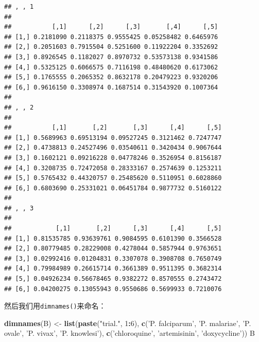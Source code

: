 \documentclass[]{book}
\newenvironment{Shaded}{\begin{snugshade}}{\end{snugshade}}
\newcommand{\DecValTok}[1]{\textcolor[rgb]{0.00,0.00,0.81}{#1}}
\newcommand{\KeywordTok}[1]{\textcolor[rgb]{0.13,0.29,0.53}{\textbf{#1}}}
\newcommand{\NormalTok}[1]{#1}
\newcommand{\OperatorTok}[1]{\textcolor[rgb]{0.81,0.36,0.00}{\textbf{#1}}}
\newcommand{\StringTok}[1]{\textcolor[rgb]{0.31,0.60,0.02}{#1}}
\begin{document}
\begin{verbatim}
## , , 1
## 
##           [,1]      [,2]      [,3]       [,4]      [,5]
## [1,] 0.2181090 0.2118375 0.9555425 0.05258482 0.6465976
## [2,] 0.2051603 0.7915504 0.5251600 0.11922204 0.3352692
## [3,] 0.8926545 0.1182027 0.8970732 0.53573138 0.9341586
## [4,] 0.5325125 0.6066575 0.7116198 0.48480620 0.6173062
## [5,] 0.1765555 0.2065352 0.8632178 0.20479223 0.9320206
## [6,] 0.9616150 0.3308974 0.1687514 0.31543920 0.1007364
## 
## , , 2
## 
##           [,1]       [,2]       [,3]      [,4]      [,5]
## [1,] 0.5689963 0.69513194 0.09527245 0.3121462 0.7247747
## [2,] 0.4738813 0.24527496 0.03540611 0.3420434 0.9067644
## [3,] 0.1602121 0.09216228 0.04778246 0.3526954 0.8156187
## [4,] 0.3208735 0.72472058 0.28333167 0.2574639 0.1253211
## [5,] 0.5765432 0.44320757 0.25485620 0.5110951 0.6028860
## [6,] 0.6803690 0.25331021 0.06451784 0.9877732 0.5160122
## 
## , , 3
## 
##            [,1]       [,2]      [,3]      [,4]      [,5]
## [1,] 0.81535785 0.93639761 0.9084595 0.6101390 0.3566528
## [2,] 0.80779485 0.28229008 0.4278044 0.5857944 0.9763651
## [3,] 0.02992416 0.01204831 0.3307078 0.3908708 0.7650749
## [4,] 0.79984989 0.26615714 0.3661389 0.9511395 0.3682314
## [5,] 0.04926234 0.56678465 0.9382272 0.8570555 0.2743472
## [6,] 0.04200275 0.13055943 0.9550686 0.5699933 0.7210076
\end{verbatim}

然后我们用\texttt{dimnames()}来命名：

\begin{Shaded}
\begin{Highlighting}[]
\KeywordTok{dimnames}\NormalTok{(B) <-}\StringTok{ }\KeywordTok{list}\NormalTok{(}\KeywordTok{paste}\NormalTok{(}\StringTok{"trial."}\NormalTok{, }\DecValTok{1}\OperatorTok{:}\DecValTok{6}\NormalTok{), }\KeywordTok{c}\NormalTok{(}\StringTok{'P. falciparum'}\NormalTok{, }\StringTok{'P. malariae'}\NormalTok{, }\StringTok{'P. ovale'}\NormalTok{, }\StringTok{'P. vivax'}\NormalTok{, }\StringTok{'P. knowlesi'}\NormalTok{), }\KeywordTok{c}\NormalTok{(}\StringTok{'chloroquine'}\NormalTok{, }\StringTok{'artemisinin'}\NormalTok{, }\StringTok{'doxycycline'}\NormalTok{))}
\NormalTok{B}
\end{Highlighting}
\end{Shaded}
\end{document}
